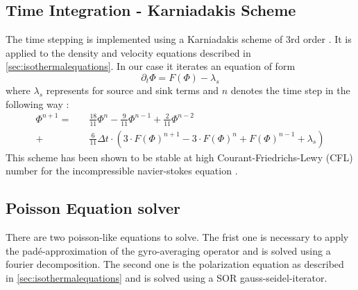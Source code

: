 \subsection{Time Integration - Karniadakis Scheme}
The time stepping is implemented using a Karniadakis scheme of 3rd order \cite{KARNIADAKIS1991414}.
It is applied to the density and velocity equations described in \autoref{sec:isothermalequations}.
In our case it iterates an equation of form
\begin{equation}
    \partial_t \Phi = F(\Phi) - \lambda_s
\end{equation}
where $\lambda_s$ represents for source and sink terms and $n$ denotes the time step in the following way :
\begin{equation}
\begin{split}
    \Phi^{n + 1} = \quad &\frac{18}{11} \Phi^{n} - \frac{9}{11} \Phi^{n-1} + \frac{2}{11}  \Phi^{n-2}\\
     + &\frac{6}{11}\Delta t \cdot (3 \cdot F(\Phi)^{n+1} - 3 \cdot F(\Phi)^{n} + F(\Phi)^{n-1} + \lambda_s)
\end{split}
\end{equation}
This scheme has been shown to be stable at high Courant-Friedrichs-Lewy (CFL) number for the incompressible navier-stokes equation \cite{KARNIADAKIS1991414}.

\subsection{Poisson Equation solver}
There are two poisson-like equations to solve. The frist one is necessary to apply the padé-approximation of the gyro-averaging operator and is solved using a fourier decomposition. The second one is the polarization equation as described in \autoref{sec:isothermalequations} and is solved using a \ac{SOR} gauss-seidel-iterator.


